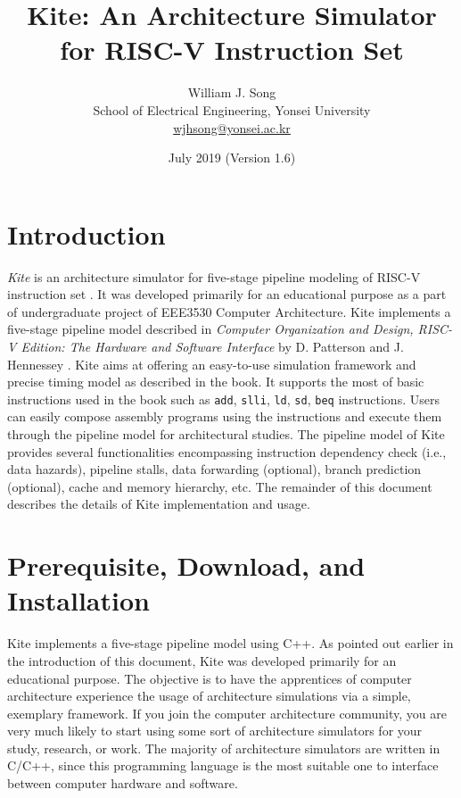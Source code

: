 \documentclass[10pt]{article}
\begin{document}
\title{Kite: An Architecture Simulator for RISC-V Instruction Set}
\author{William J. Song\\
        School of Electrical Engineering, Yonsei University\\
        \href{mailto:wjhsong@yonsei.ac.kr}{wjhsong@yonsei.ac.kr}}
\date{July 2019 (Version 1.6)}
\maketitle

\section{Introduction} \label{sec:introduction}
\emph{Kite} is an architecture simulator for five-stage pipeline modeling of RISC-V instruction set \cite{waterman_riscv2019}.
It was developed primarily for an educational purpose as a part of undergraduate project of EEE3530 Computer Architecture.
Kite implements a five-stage pipeline model described in \emph{Computer Organization and Design, RISC-V Edition: The Hardware and Software Interface} by D. Patterson and J. Hennessey \cite{patterson_morgan2017}.
Kite aims at offering an easy-to-use simulation framework and precise timing model as described in the book.
It supports the most of basic instructions used in the book such as {\tt add}, {\tt slli}, {\tt ld}, {\tt sd}, {\tt beq} instructions.
Users can easily compose assembly programs using the instructions and execute them through the pipeline model for architectural studies.
The pipeline model of Kite provides several functionalities encompassing instruction dependency check (i.e., data hazards), pipeline stalls, data forwarding (optional), branch prediction (optional), cache and memory hierarchy, etc.
The remainder of this document describes the details of Kite implementation and usage.

\section{Prerequisite, Download, and Installation} \label{sec:install}
Kite implements a five-stage pipeline model using C++.
As pointed out earlier in the introduction of this document, Kite was developed primarily for an educational purpose.
The objective is to have the apprentices of computer architecture experience the usage of architecture simulations via a simple, exemplary framework.
If you join the computer architecture community, you are very much likely to start using some sort of architecture simulators for your study, research, or work.
The majority of architecture simulators are written in C/C++, since this programming language is the most suitable one to interface between computer hardware and software.
\end{document}
